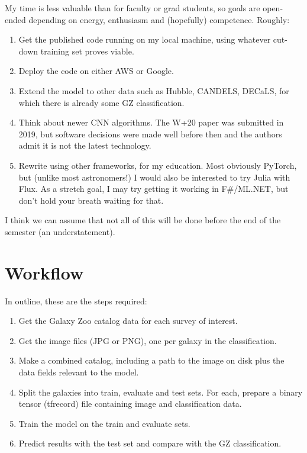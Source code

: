 \documentclass[twocolumn, twocolappendix, tighten]{aastex631}
\begin{document}
My time is less valuable than for faculty or grad students, so goals are open-ended depending on energy, enthusiasm and (hopefully) competence. Roughly:
\begin{enumerate}
	\item Get the published code running on my local machine, using whatever cut-down training set proves viable.
	\item Deploy the code on either AWS or Google.
	\item Extend the model to other data such as Hubble, CANDELS, DECaLS, for which there is already some GZ classification.
	\item Think about newer CNN algorithms. The W+20 paper was submitted in 2019, but software decisions were made well before then and the authors admit it is not the latest technology.
	\item Rewrite using other frameworks, for my education. Most obviously PyTorch, but (unlike most astronomers!) I would also be interested to try Julia with Flux. As a stretch goal, I may try getting it working in F\#/ML.NET, but don't hold your breath waiting for that.
\end{enumerate}

I think we can assume that not all of this will be done before the end of the semester (an understatement).

\section{Workflow}

In outline, these are the steps required:

\begin{enumerate}
	\item Get the Galaxy Zoo catalog data for each survey of interest.
	\item Get the image files (JPG or PNG), one per galaxy in the classification.
	\item Make a combined catalog, including a path to the image on disk plus the data fields relevant to the model.
	\item Split the galaxies into train, evaluate and test sets. For each, prepare a binary tensor (tfrecord) file containing image and classification data.
	\item Train the model on the train and evaluate sets.
	\item Predict results with the test set and compare with the GZ classification.
\end{enumerate}
\end{document}
